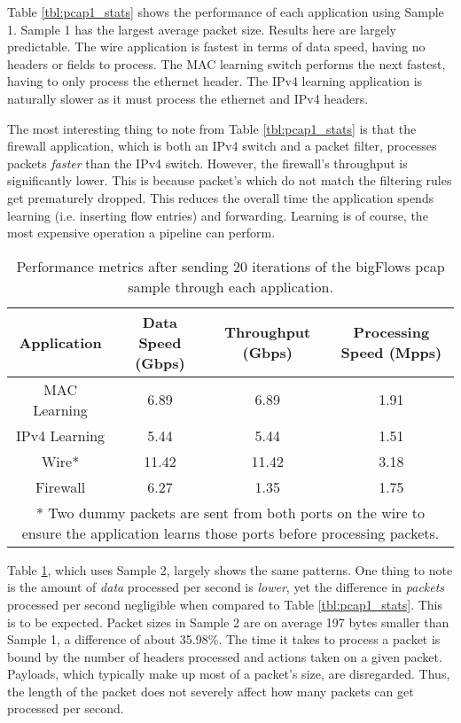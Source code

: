 Table \ref{tbl:pcap1_stats} shows the performance of each application using Sample 1. Sample 1 has the largest average packet size. Results here are largely predictable. The wire application is fastest in terms of data speed, having no headers or fields to process. The MAC learning switch performs the next fastest, having to only process the ethernet header. The IPv4 learning application is naturally slower as it must process the ethernet and IPv4 headers.

The most interesting thing to note from Table \ref{tbl:pcap1_stats} is that the firewall application, which is both an IPv4 switch and a packet filter, processes packets \textit{faster} than the IPv4 switch. However, the firewall's throughput is significantly lower. This is because packet's which do not match the filtering rules get prematurely dropped. This reduces the overall time the application spends learning (i.e. inserting flow entries) and forwarding. Learning is of course, the most expensive operation a pipeline can perform.

\begin{table}
\caption{Performance metrics after sending 20 iterations of the bigFlows pcap sample through each application.}
\begin{center}
\begin{tabularx}{\textwidth}{| c || c | c | c | }
\hline
Application & Data Speed (Gbps) & Throughput (Gbps) & Processing Speed (Mpps)  \\
\hline
MAC Learning & 6.89 & 6.89 & 1.91  \\
\hline
IPv4 Learning & 5.44 & 5.44 & 1.51  \\
\hline 
Wire* & 11.42 & 11.42 & 3.18 \\
\hline
Firewall & 6.27 & 1.35 & 1.75 \\
\hline
\multicolumn{4}{p{\linewidth}}{* Two dummy packets are sent from both ports on the wire to ensure the application learns those ports before processing packets.}
\end{tabularx}
\end{center}
\label{tbl:pcap2_stats}
\end{table}

Table \ref{tbl:pcap2_stats}, which uses Sample 2, largely shows the same patterns. One thing to note is the amount of \textit{data} processed per second is \textit{lower}, yet the difference in \textit{packets} processed per second negligible when compared to Table \ref{tbl:pcap1_stats}. This is to be expected. Packet sizes in Sample 2 are on average 197 bytes smaller than Sample 1, a difference of about 35.98\%. The time it takes to process a packet is bound by the number of headers processed and actions taken on a given packet. Payloads, which typically make up most of a packet's size, are disregarded. Thus, the length of the packet does not severely affect how many packets can get processed per second. 


